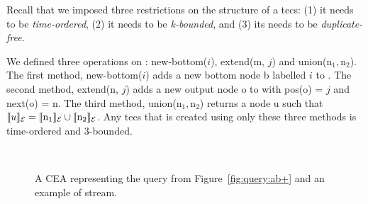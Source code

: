 Recall that we imposed three restrictions on the structure of a \acrshort{tecs}: (1) it needs to be \emph{time-ordered}, (2) it needs to be \emph{k-bounded}, and (3) its needs to be \emph{duplicate-free}.

We defined three operations on \tecs: new-bottom($i$), extend(m, $j$) and union($\text{n}_{1},\text{n}_{2}$). The first method, new-bottom($i$) adds a new bottom node b labelled $i$ to \tecs. The second method, extend(n, $j$) adds a new output node o to \tecs with pos(o) = $j$ and next(o) = n. The third method, union($\text{n}_{1},\text{n}_{2}$) returns a node u such that $\llbracket u \rrbracket_{\mathcal{E}} = \llbracket \text{n}_{1} \rrbracket_{\mathcal{E}} \cup \llbracket \text{n}_{2} \rrbracket_{\mathcal{E}}$. Any \acrshort{tecs} that is created using only these three methods is time-ordered and $3$-bounded.

\begin{figure}[H]
  \centering
  \begin{subfigure}[b]{\textwidth}
    \centering
  \end{subfigure}
  \\
  \begin{subfigure}[t]{\textwidth}
    \centering
  \end{subfigure}

  \caption{A CEA representing the query from Figure~\ref{fig:query:ab+} and an example of stream.}
  \label{fig:cea:ab+}
\end{figure}

